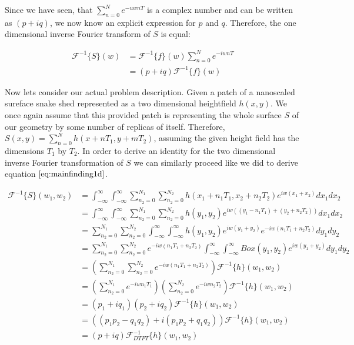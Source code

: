 Since we have seen, that $\sum_{n=0}^N e^{-uwnT}$ is a complex number and can be written as $(p+iq)$, we now know an explicit expression for $p$ and $q$. Therefore, the one dimensional inverse Fourier transform of $S$ is equal:

\begin{align}
\mathcal{F}^{-1}\{S\}(w)
& =\mathcal{F}^{-1}\{f\}(w) \sum_{n=0}^{N} e^{-iwnT} \nonumber \\
& = (p+iq) \mathcal{F}^{-1}\{f\}(w)  
\label{eq:mainfinding1d}
\end{align}


Now lets consider our actual problem description. Given a patch of a nanoscaled sureface snake shed represented as a two dimensional heightfield $h(x,y)$. We once again assume that this provided patch is representing the whole surface $S$ of our geometry by some number of replicas of itself. Therefore, $S(x,y) = \sum_{n=0}^{N} h(x+nT_1, y+mT_2)$, assuming the given height field has the dimensions $T_1$ by $T_2$. In order to derive an identity for the two dimensional inverse Fourier transformation of $S$ we can similarly proceed like we did to derive equation $\ref{eq:mainfinding1d}$.

\begin{align}
\mathcal{F}^{-1}\{S\}(w_1, w_2)
& = \int_{-\infty}^{\infty}\int_{-\infty}^{\infty} \sum_{n_2=0}^{N_1} \sum_{n_2=0}^{N_2} h(x_1 + n_1 T_1, x_2 + n_2 T_2) e^{iw(x_1 + x_2)}dx_1 dx_2 \nonumber \\
& = \int_{-\infty}^{\infty}\int_{-\infty}^{\infty} \sum_{n_2=0}^{N_1} \sum_{n_2=0}^{N_2} h(y_1, y_2) e^{iw((y_1 - n_1 T_1) + (y_2 + n_2 T_2))}dx_1 dx_2 \nonumber \\
& =\sum_{n_2=0}^{N_1} \sum_{n_2=0}^{N_2} \int_{-\infty}^{\infty}\int_{-\infty}^{\infty} h(y_1, y_2) e^{iw(y_1 + y_2)} e^{-iw(n_1 T_1 + n_2 T_2)}dy_1 dy_2 \nonumber \\
& =\sum_{n_2=0}^{N_1} \sum_{n_2=0}^{N_2} e^{-iw(n_1 T_1 + n_2 T_2)} \int_{-\infty}^{\infty}\int_{-\infty}^{\infty} Box(y_1, y_2) e^{iw(y_1 + y_2)} dy_1 dy_2 \nonumber \\
& =\left(\sum_{n_2=0}^{N_1} \sum_{n_2=0}^{N_2} e^{-iw(n_1 T_1 + n_2 T_2)}\right) \mathcal{F}^{-1}\{h\}(w_1,w_2) \nonumber \\
& =\left(\sum_{n_2=0}^{N_1} e^{-iw n_1 T_1}\right) \left(\sum_{n_2=0}^{N_2} e^{-iw n_2 T_2}\right) \mathcal{F}^{-1}\{h\}(w_1,w_2) \nonumber \\
& =(p_1 + i q_1)(p_2 + i q_2) \mathcal{F}^{-1}\{h\}(w_1,w_2) \nonumber \\
& =((p_1 p_2 - q_1 q_2) + i(p_1 p_2 + q_1 q_2)) \mathcal{F}^{-1}\{h\}(w_1,w_2) \nonumber \\
& =(p + iq) \mathcal{F}_{DTFT}^{-1}\{h\}(w_1,w_2)
\label{eq:pqmainfinding}
\end{align}

